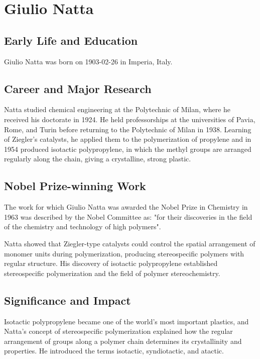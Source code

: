 \clearpage

\section{Giulio Natta}

\subsection*{Early Life and Education}

Giulio Natta was born on 1903-02-26 in Imperia, Italy.

\subsection*{Career and Major Research}

Natta studied chemical engineering at the Polytechnic of Milan, where he received his doctorate in 1924. He held professorships at the universities of Pavia, Rome, and Turin before returning to the Polytechnic of Milan in 1938. Learning of Ziegler's catalysts, he applied them to the polymerization of propylene and in 1954 produced isotactic polypropylene, in which the methyl groups are arranged regularly along the chain, giving a crystalline, strong plastic.

\subsection*{Nobel Prize-winning Work}

The work for which Giulio Natta was awarded the Nobel Prize in Chemistry in 1963 was described by the Nobel Committee as: "for their discoveries in the field of the chemistry and technology of high polymers".

Natta showed that Ziegler-type catalysts could control the spatial arrangement of monomer units during polymerization, producing stereospecific polymers with regular structure. His discovery of isotactic polypropylene established stereospecific polymerization and the field of polymer stereochemistry.

\subsection*{Significance and Impact}

Isotactic polypropylene became one of the world's most important plastics, and Natta's concept of stereospecific polymerization explained how the regular arrangement of groups along a polymer chain determines its crystallinity and properties. He introduced the terms isotactic, syndiotactic, and atactic.

